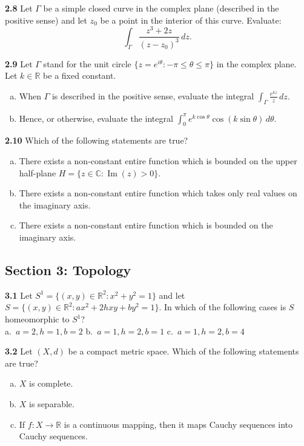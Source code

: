 \documentclass[11pt,a4paper]{article}
\newcommand{\R}{\mathbb{R}}
\newcommand{\C}{\mathbb{C}}
\newcommand{\ImPart}{\operatorname{Im}}
\newcommand{\examsec}[1]{%
  \subsection*{#1}
  \vspace{-2pt}
}
\newcommand{\qitem}[1]{\par\medskip\noindent\textbf{#1}\hspace{0.5em}}
\begin{document}
\qitem{2.8} Let $\Gamma$ be a simple closed curve in the complex plane (described in the positive sense) and let $z_0$ be a point in the interior of this curve. Evaluate:
\[
  \int_{\Gamma} \frac{z^3 + 2z}{(z - z_0)^3}\,dz.
\]

\qitem{2.9} Let $\Gamma$ stand for the unit circle $\{z = e^{i\theta} : -\pi \le \theta \le \pi\}$ in the complex plane. Let $k \in \R$ be a fixed constant.
\begin{enumerate}[a.]
  \item When $\Gamma$ is described in the positive sense, evaluate the integral $\displaystyle\int_{\Gamma} \frac{e^{kz}}{z}\,dz$.
  \item Hence, or otherwise, evaluate the integral $\displaystyle\int_0^{\pi} e^{k\cos\theta}\cos(k\sin\theta)\,d\theta$.
\end{enumerate}

\qitem{2.10} Which of the following statements are true?
\begin{enumerate}[a.]
  \item There exists a non-constant entire function which is bounded on the upper half-plane $H = \{z \in \C : \ImPart(z) > 0\}$.
  \item There exists a non-constant entire function which takes only real values on the imaginary axis.
  \item There exists a non-constant entire function which is bounded on the imaginary axis.
\end{enumerate}

\examsec{Section 3: Topology}

\qitem{3.1} Let $S^1 = \{(x, y) \in \R^2 : x^2 + y^2 = 1\}$ and let $S = \{(x, y) \in \R^2 : ax^2 + 2hxy + by^2 = 1\}$. In which of the following cases is $S$ homeomorphic to $S^1$?\\
a.\ $a = 2, h = 1, b = 2$ \qquad b.\ $a = 1, h = 2, b = 1$ \qquad c.\ $a = 1, h = 2, b = 4$

\qitem{3.2} Let $(X, d)$ be a compact metric space. Which of the following statements are true?
\begin{enumerate}[a.]
  \item $X$ is complete.
  \item $X$ is separable.
  \item If $f : X \to \R$ is a continuous mapping, then it maps Cauchy sequences into Cauchy sequences.
\end{enumerate}
\end{document}
